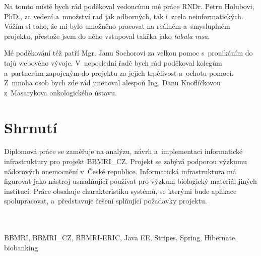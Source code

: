 \documentclass[11pt, final, oneside]{fithesis2}
\newcommand{\ProjectName}{\mbox{BBMRI\_CZ}\xspace}
\begin{document}

\FrontMatter
\ThesisTitlePage

\begin{ThesisDeclaration}
  \DeclarationText
  \AdvisorName
\end{ThesisDeclaration}

\begin{ThesisThanks}
Na tomto místě bych rád poděkoval vedoucímu mé práce RNDr. Petru Holubovi, PhD., za vedení a~množství rad jak odborných, tak i~zcela neinformatických. Vážím si toho, že mi bylo umožněno pracovat na reálném a~smysluplném projektu, přestože jsem do něho vstupoval takřka jako \textit{tabula rasa}.

Mé poděkování též patří Mgr. Janu Sochorovi za velkou pomoc s~pronikáním do tajů webového vývoje. 
V~neposlední řadě bych rád poděkoval kolegům a~partnerům zapojeným do projektu za jejich trpělivost a~ochotu pomoci. Z~mnoha osob bych zde rád jmenoval alespoň Ing. Danu Knoflíčkovou z~Masarykova onkologického ústavu. 
\end{ThesisThanks}




\chapter*{Shrnutí}
Diplomová práce se zaměřuje na analýzu, návrh a~implementaci informatické infrastruktury pro projekt \ProjectName. Projekt se zabývá podporou výzkumu nádorových onemocnění v~České republice. Informatická infrastruktura má figurovat jako nástroj usnadňující používat pro výzkum biologický materiál jiných institucí. Práce obsahuje charakteristiku systémů, se kterými bude aplikace spolupracovat, a~představuje řešení splňující požadavky projektu.

\vspace{4em} 
 \\ \\ 
\noindent BBMRI, \ProjectName, BBMRI-ERIC, Java EE, Stripes, Spring, Hibernate, biobanking
\end{document}
